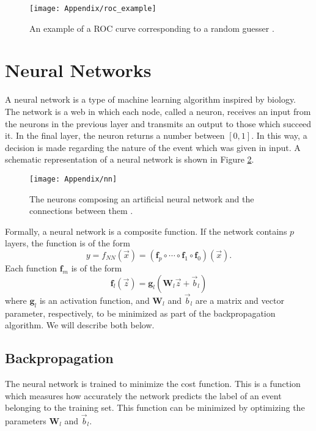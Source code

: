 \documentclass[10pt,a4paper]{book}
\begin{document}
\begin{figure}
\centering
\texttt{[image: Appendix/roc\_example]}
\caption{An example of a ROC curve corresponding to a random guesser \cite{burkov2019hundred}.}
\label{roc example}
\end{figure}

\section{Neural Networks}
A neural network is a type of machine learning algorithm inspired by biology. The network is a web in which each node, called a neuron, receives an input from the neurons in the previous layer and transmits an output to those which succeed it. In the final layer, the neuron returns a number between $[0,1]$. In this way, a decision is made regarding the nature of the event which was given in input.  A schematic representation of a neural network is shown in Figure \ref{nn image}.
\begin{figure}
\centering
\texttt{[image: Appendix/nn]}
\caption{The neurons composing an artificial neural network and the connections between them \cite{nn_image}.}
\label{nn image}
\end{figure}

Formally, a neural network is a composite function. If the network contains $p$ layers, the function is of the form
\begin{equation}
y = f_{NN}(\vec{x}) = \left( \mathbf{f}_p \circ \cdots \circ \mathbf{f}_1 \circ \mathbf{f}_0\right) (\vec{x}).
\label{NN equation}
\end{equation}
Each function $\mathbf{f}_m$ is of the form
\begin{equation}
\mathbf{f}_l (\vec{z}) = \mathbf{g}_l \left(\mathbf{W}_l\vec{z} + \vec{b}_l \right)
\label{activation function}
\end{equation}
where $\mathbf{g}_l$ is an activation function, and $\mathbf{W}_l$ and $\vec{b}_l$ are a matrix and vector parameter, respectively, to be minimized as part of the backpropagation algorithm. We will describe both below. 

\subsection{Backpropagation}
The neural network is trained to minimize the cost function. This is a function which measures how accurately the network predicts the label of an event belonging to the training set. This function can be minimized by optimizing the parameters $\mathbf{W}_l$ and $\vec{b}_l$. 
\end{document}

